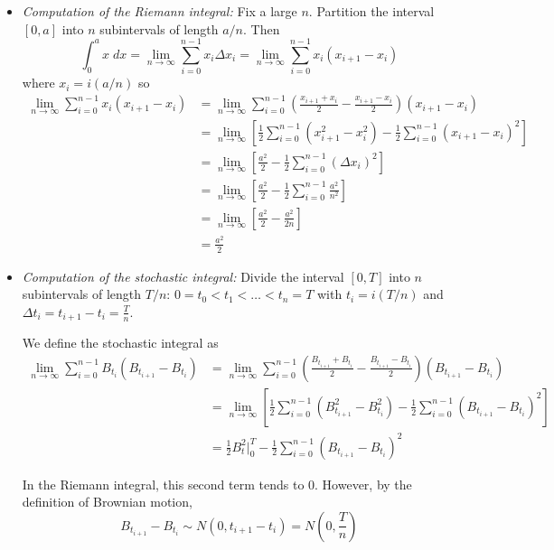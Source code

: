 \documentclass[12pt]{report}
\begin{document}
    \begin{itemize}
        \item \emph{Computation of the Riemann integral:} Fix a large $n$. Partition the interval $[0, a]$ into $n$ subintervals of length $a/n$. Then
        \[\int_0^a x\; dx = \lim_{n \to \infty} \sum_{i=0}^{n- 1} x_i \Delta x_i = \lim_{n \to \infty} \sum_{i=0}^{n- 1} x_i(x_{i+1} - x_i)\]
        where $x_i = i(a/n)$ so 
        \begin{align*}
            \lim_{n \to \infty} \sum_{i=0}^{n- 1} x_i (x_{i+1}- x_i) &= \lim_{n \to \infty} \sum_{i=0}^{n- 1} \left(\frac{x_{i+1} + x_i}{2} - \frac{x_{i+1} - x_i}{2}\right) (x_{i+1} - x_i)\\ 
            &= \lim_{n \to \infty} \left[\frac{1}{2}  \sum_{i=0}^{n- 1} (x_{i+1}^2 - x_i^2) - \frac{1}{2}\sum_{i=0}^{n- 1} (x_{i+1} - x_i)^2\right]\\ 
            &= \lim_{n \to \infty} \left[ \frac{a^2}{2} - \frac{1}{2}\sum_{i=0}^{n- 1} (\Delta x_i)^2\right]\\ 
            &= \lim_{n \to \infty} \left[ \frac{a^2}{2} - \frac{1}{2}\sum_{i=0}^{n- 1} \frac{a^2}{n^2}\right]\\ 
            &= \lim_{n \to \infty} \left[ \frac{a^2}{2} -\frac{a^2}{2n}\right]\\ 
            &= \frac{a^2}{2}
        \end{align*}

        \item \emph{Computation of the stochastic integral:} Divide the interval $[0, T]$ into $n$ subintervals of length $T/n$: $0 = t_0 <t_1 < \dots < t_n = T$ with $t_i = i(T/n)$ and $\Delta t_i = t_{i+1} - t_i = \frac{T}{n}$. 
        
        We define the stochastic integral as 
        \begin{align*}
            \lim_{n \to \infty} \sum_{i=0}^{n- 1} B_{t_i} (B_{t_{i+1}} - B_{t_i}) &= \lim_{n \to \infty} \sum_{i=0}^{n- 1} \left(\frac{B_{t_{i+1}} + B_{t_i}}{2} - \frac{B_{t_{i+1}} - B_{t_i}}{2}\right) (B_{t_{i+1}} - B_{t_i})\\
            &= \lim_{n \to \infty} \left[\frac{1}{2} \sum_{i=0}^{n- 1} (B_{t_{i+1}}^2 - B_{t_i}^2) - \frac{1}{2} \sum_{i=0}^{n- 1} (B_{t_{i+1}} - B_{t_i})^2\right]\\
            &= \frac{1}{2} B_t^2 \bigg\vert_0^T - \frac{1}{2} \sum_{i=0}^{n- 1}(B_{t_{i+1}} - B_{t_i})^2
        \end{align*}

        In the Riemann integral, this second term tends to 0. However, by the definition of Brownian motion, 
        \[B_{t_{i+1}} - B_{t_i} \sim N(0, t_{i+1} - t_i) = N(0, \frac{T}{n})\]


\end{itemize}
\end{document}
